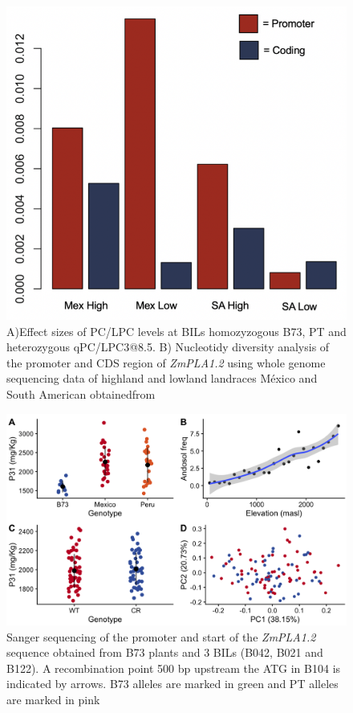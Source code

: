\documentclass[9pt,twocolumn,twoside,lineno]{BioRxiv}
\begin{document}
\begin{figure}[t]
\begin{center}
\includegraphics[width=0.8\paperwidth]{Sup_Figures/Sup_Fig_5.png}
\caption{A)Effect sizes of PC/LPC levels at BILs homozyzogous B73, PT and heterozygous qPC/LPC3@8.5.
B) Nucleotidy diversity analysis of the promoter and CDS region of \textit{ZmPLA1.2} using whole genome sequencing data of highland and lowland landraces México and South American obtainedfrom \cite{Wang2017-bc}
}
\label{SupFig6}
\end{center}
\end{figure} 

\begin{figure}[t]
\begin{center}
\includegraphics[width=0.8\paperwidth]{Sup_Figures/Sup_Fig_6.png}
\caption{Sanger sequencing of the promoter and start of the \textit{ZmPLA1.2} sequence obtained from B73 plants and 3 BILs (B042, B021 and B122). A recombination point 500 bp upstream the ATG in B104 is indicated by arrows. B73 alleles are marked in green and PT alleles are marked in pink}
\label{SupFig5}
\end{center}
\end{figure} 
\end{document}
